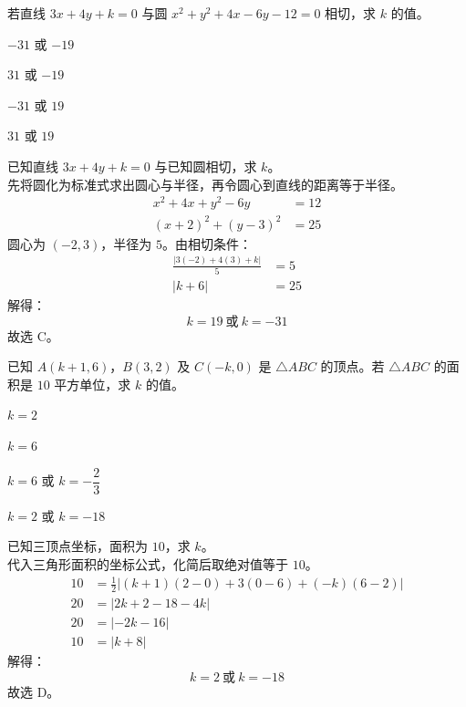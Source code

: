 \documentclass[12pt,a4paper]{exam-zh}
\begin{document}
\begin{question}
    若直线 $3x+4y+k=0$ 与圆 $x^{2}+y^{2}+4x-6y-12=0$ 相切，求 $k$ 的值。\paren[C]
    \begin{choices}
        \item $-31$ 或 $-19$
        \item $31$ 或 $-19$
        \item $-31$ 或 $19$
        \item $31$ 或 $19$
    \end{choices}
\end{question}

\begin{solution}
    已知直线 $3x+4y+k=0$ 与已知圆相切，求 $k$。 \\
    先将圆化为标准式求出圆心与半径，再令圆心到直线的距离等于半径。
    \begin{align*}
        x^{2}+4x+y^{2}-6y &= 12 \\
        (x+2)^{2}+(y-3)^{2} &= 25
    \end{align*}
    圆心为 $(-2,3)$，半径为 $5$。由相切条件：
    \begin{align*}
        \frac{|3(-2)+4(3)+k|}{5} &= 5 \\
        |k+6| &= 25
    \end{align*}
    解得：
    \[
        k=19 \ \text{或} \ k=-31
    \]
    故选 C。
\end{solution}

\begin{question}
    已知 $A(k+1,6)$，$B(3,2)$ 及 $C(-k,0)$ 是 $\triangle ABC$ 的顶点。若 $\triangle ABC$ 的面积是 $10$ 平方单位，求 $k$ 的值。\paren[D]
    \begin{choices}[columns=2,linesep=0pt]
        \item $k=2$
        \item $k=6$
        \item $k=6$ 或 $k=-\dfrac{2}{3}$
        \item $k=2$ 或 $k=-18$
    \end{choices}
\end{question}

\begin{solution}
    已知三顶点坐标，面积为 $10$，求 $k$。 \\
    代入三角形面积的坐标公式，化简后取绝对值等于 $10$。
    \begin{align*}
        10 &= \frac{1}{2}\left|(k+1)(2-0)+3(0-6)+(-k)(6-2)\right| \\
        20 &= \left|2k+2-18-4k\right| \\
        20 &= \left|-2k-16\right| \\
        10 &= |k+8|
    \end{align*}
    解得：
    \[
        k=2 \ \text{或} \ k=-18
    \]
    故选 D。
\end{solution}
\end{document}
